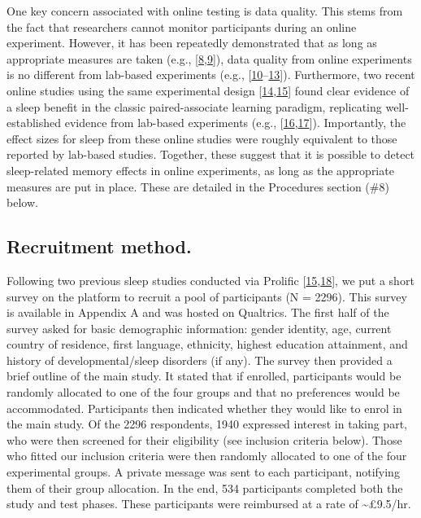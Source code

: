 \documentclass[
]{article}
\begin{document}
One key concern associated with online testing is data quality. This stems from the fact that researchers cannot monitor participants during an online experiment. However, it has been repeatedly demonstrated that as long as appropriate measures are taken (e.g., {[}\protect\hyperlink{ref-rodd2019a}{8},\protect\hyperlink{ref-curtis2022a}{9}{]}), data quality from online experiments is no different from lab-based experiments (e.g., {[}\protect\hyperlink{ref-anwyl-irvine2020a}{10}--\protect\hyperlink{ref-mak2021b}{13}{]}). Furthermore, two recent online studies using the same experimental design {[}\protect\hyperlink{ref-ashton2021a}{14},\protect\hyperlink{ref-mak2023a}{15}{]} found clear evidence of a sleep benefit in the classic paired-associate learning paradigm, replicating well-established evidence from lab-based experiments (e.g., {[}\protect\hyperlink{ref-lo2014a}{16},\protect\hyperlink{ref-plihal1997a}{17}{]}). Importantly, the effect sizes for sleep from these online studies were roughly equivalent to those reported by lab-based studies. Together, these suggest that it is possible to detect sleep-related memory effects in online experiments, as long as the appropriate measures are put in place. These are detailed in the Procedures section (\#8) below.

\hypertarget{recruitment-method.}{%
\subsection{Recruitment method.}\label{recruitment-method.}}

Following two previous sleep studies conducted via Prolific {[}\protect\hyperlink{ref-mak2023a}{15},\protect\hyperlink{ref-mak2023b}{18}{]}, we put a short survey on the platform to recruit a pool of participants (N = 2296). This survey is available in Appendix A and was hosted on Qualtrics. The first half of the survey asked for basic demographic information: gender identity, age, current country of residence, first language, ethnicity, highest education attainment, and history of developmental/sleep disorders (if any). The survey then provided a brief outline of the main study. It stated that if enrolled, participants would be randomly allocated to one of the four groups and that no preferences would be accommodated. Participants then indicated whether they would like to enrol in the main study. Of the 2296 respondents, 1940 expressed interest in taking part, who were then screened for their eligibility (see inclusion criteria below). Those who fitted our inclusion criteria were then randomly allocated to one of the four experimental groups. A private message was sent to each participant, notifying them of their group allocation. In the end, 534 participants completed both the study and test phases. These participants were reimbursed at a rate of \textasciitilde£9.5/hr.
\end{document}
